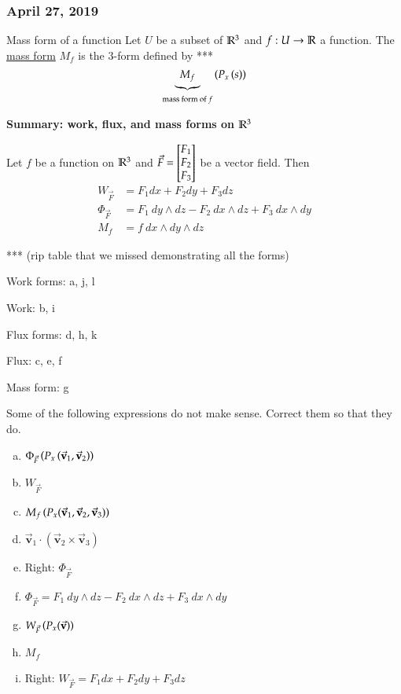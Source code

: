 \subsubsection*{April 27, 2019}

\begin{defn}{Mass form of a function}
	Let $U$ be a subset of $\mathbb{R}^3$ and $f : U\to \mathbb{R}$ a function. The \ul{mass form} $M_f$ is the 3-form defined by ***
	\begin{equation}
		\underbrace{M_f}_{\text{mass form of $f$}} \left( P_x\left( s \right) \right)
	\end{equation}
\end{defn}


\textbf{Summary: work, flux, and mass forms on $\mathbb{R}^3$}

Let $f$ be a function on $\mathbb{R}^3$ and $\vec{F}=\begin{bmatrix} F_1 \\ F_2 \\ F_3 \end{bmatrix}$ be a vector field. Then
\begin{align}
	W_{\vec{F}} &= F_1 dx + F_2 dy + F_3 dz \\
	\Phi_{\vec{F}} &= F_1\ dy\land dz - F_2\ dx\land dz + F_3\ dx\land dy \\
	M_f &= f\ dx\land dy \land dz
\end{align}

*** (rip table that we missed demonstrating all the forms)


Work forms: a, j, l

Work: b, i

Flux forms: d, h, k

Flux: c, e, f

Mass form: g

 Some of the following expressions do not make sense. Correct them so that they do. 

\begin{enumerate}[a.]
	\item $\Phi_{\vec{F}}\left( P_x\left( \vec{\textbf{v}}_1, \vec{\textbf{v}}_2 \right) \right)$
	\item $W_{\vec{F}}$
	\item $M_f\left( P_x(\vec{\textbf{v}}_1, \vec{\textbf{v}}_2, \vec{\textbf{v}}_3) \right)$
	\item $\vec{\bm{v}}_1 \cdot (\vec{\bm{v}}_2 \times \vec{\bm{v}}_3)$
	\item Right: $\Phi_{\vec{F}}$
	\item $\Phi_{\vec{F}} = F_1\ dy\land dz - F_2\ dx\land dz + F_3\ dx\land dy$
	\item $W_{\vec{F}}\left( P_x(\vec{\textbf{v}}) \right)$
	\item $M_f$
	\item Right: $W_{\vec{F}} = F_1 dx + F_2 dy + F_3 dz$
\end{enumerate}

